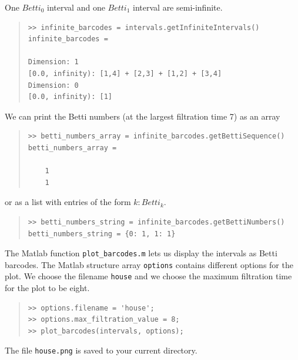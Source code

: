 \documentclass[amscd, amssymb, verbatim]{amsart}[12pt]
\theoremstyle{remark}
\theoremstyle{remark}
\theoremstyle{remark}
\begin{document}
One $Betti_0$ interval and one $Betti_1$ interval are semi-infinite. 
\begin{quote} \begin{verbatim}
>> infinite_barcodes = intervals.getInfiniteIntervals()
infinite_barcodes = 

Dimension: 1
[0.0, infinity): [1,4] + [2,3] + [1,2] + [3,4]
Dimension: 0
[0.0, infinity): [1]
\end{verbatim} \end{quote}

We can print the Betti numbers (at the largest filtration time 7) as an array

\begin{quote} \begin{verbatim}
>> betti_numbers_array = infinite_barcodes.getBettiSequence()
betti_numbers_array =

    1
    1
\end{verbatim} \end{quote}

or as a list with entries of the form $k: Betti_k$.

\begin{quote} \begin{verbatim}
>> betti_numbers_string = infinite_barcodes.getBettiNumbers()
betti_numbers_string = {0: 1, 1: 1} 
\end{verbatim} \end{quote}

The Matlab function \texttt{plot\_barcodes.m} lets us display the intervals as Betti barcodes. The Matlab structure array \texttt{options} contains different options for the plot. We choose the filename \texttt{house} and we choose the maximum filtration time for the plot to be eight.
\begin{quote} \begin{verbatim}
>> options.filename = 'house';
>> options.max_filtration_value = 8;
>> plot_barcodes(intervals, options);
\end{verbatim} \end{quote}

The file \texttt{house.png} is saved to your current directory.
\end{document}
